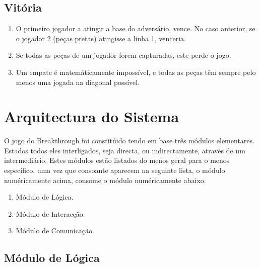 \documentclass[15pt,a4paper]{article}
\begin{document}
\subsection{Vitória}
\begin{enumerate}
\item O primeiro jogador a atingir a base do adversário, vence. No caso anterior, se o jogador 2 (peças pretas) atingisse a linha 1, venceria.
\item Se todas as peças de um jogador forem capturadas, este perde o jogo.
\item Um empate é matemáticamente impossível, e todas as peças têm sempre pelo menos uma jogada na diagonal possível.
\end{enumerate}


\newpage

\section{Arquitectura do Sistema}

O jogo do Breakthrough foi constitúido tendo em base três módulos elementares. Estados todos eles interligados, seja directa, ou indirectamente, através de um intermediário. Estes módulos estão listados do menos geral para o menos específico, uma vez que consoante aparecem na seguinte lista, o módulo numéricamente acima, consome o módulo numéricamente abaixo.

\begin{enumerate}
\item Módulo de Lógica.
\item Módulo de Interacção.
\item Módulo de Comunicação.
\end{enumerate}




\subsection{Módulo de Lógica}
\end{document}
